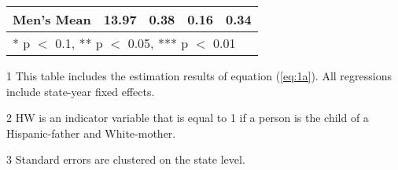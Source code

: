 \begin{table}[H]
\begin{threeparttable}
\begin{tabular}[t]{lcccc}
Men's Mean & 13.97 & 0.38 & 0.16 & 0.34\\
\bottomrule
\multicolumn{5}{l}{\rule{0pt}{1em}* p $<$ 0.1, ** p $<$ 0.05, *** p $<$ 0.01}\\
\end{tabular}
\begin{tablenotes}
\item[1] {\footnotesize{This table includes the estimation results of equation (\ref{eq:1a}). All regressions include state-year fixed effects.}}
\item[2] {\footnotesize{HW is an indicator variable that is equal to 1 if a person is the child of a Hispanic-father and White-mother.}}
\item[3] {\footnotesize{Standard errors are clustered on the state level.}}
\end{tablenotes}
\end{threeparttable}
\end{table}
